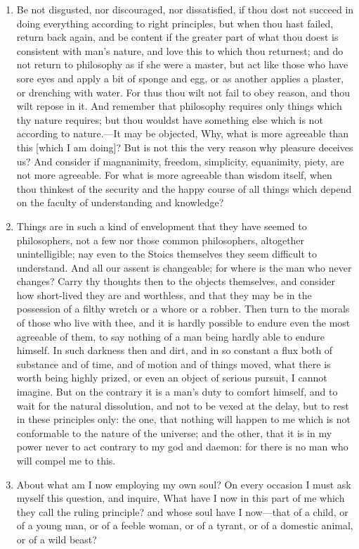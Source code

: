 \begin{enumerate}
\item Be not disgusted, nor discouraged, nor dissatisfied, if thou dost not succeed in doing everything according to right principles, but when thou hast failed, return back again, and be content if the greater part of what thou doest is consistent with man's nature, and love this to which thou returnest; and do not return to philosophy as if she were a master, but act like those who have sore eyes and apply a bit of sponge and egg, or as another applies a plaster, or drenching with water. For thus thou wilt not fail to obey reason, and thou wilt repose in it. And remember that philosophy requires only things which thy nature requires; but thou wouldst have something else which is not according to nature.—It may be objected, Why, what is more agreeable than this [{\clarify which I am doing}]? But is not this the very reason why pleasure deceives us? And consider if magnanimity, freedom, simplicity, equanimity, piety, are not more agreeable. For what is more agreeable than wisdom itself, when thou thinkest of the security and the happy course of all things which depend on the faculty of understanding and knowledge?

\item Things are in such a kind of envelopment that they have seemed to philosophers, not a few nor those common philosophers, altogether unintelligible; nay even to the Stoics themselves they seem difficult to understand. And all our assent is changeable; for where is the man who never changes? Carry thy thoughts then to the objects themselves, and consider how short-lived they are and worthless, and that they may be in the possession of a filthy wretch or a whore or a robber. Then turn to the morals of those who live with thee, and it is hardly possible to endure even the most agreeable of them, to say nothing of a man being hardly able to endure himself. In such darkness then and dirt, and in so constant a flux both of substance and of time, and of motion and of things moved, what there is worth being highly prized, or even an object of serious pursuit, I cannot imagine. But on the contrary it is a man's duty to comfort himself, and to wait for the natural dissolution, and not to be vexed at the delay, but to rest in these principles only: the one, that nothing will happen to me which is not conformable to the nature of the universe; and the other, that it is in my power never to act contrary to my god and daemon: for there is no man who will compel me to this.

\item About what am I now employing my own soul? On every occasion I must ask myself this question, and inquire, What have I now in this part of me which they call the ruling principle? and whose soul have I now—that of a child, or of a young man, or of a feeble woman, or of a tyrant, or of a domestic animal, or of a wild beast?


\end{enumerate}
